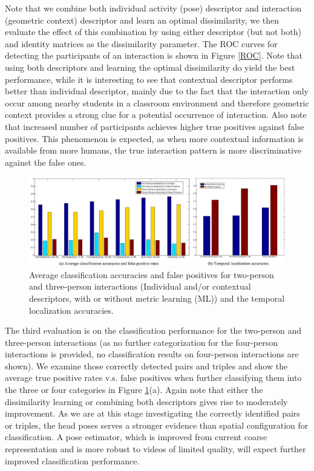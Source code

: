 \documentclass[10pt,twocolumn,letterpaper]{article}
\begin{document}
Note that we combine both individual activity (pose) descriptor and interaction (geometric context) descriptor and learn an optimal dissimilarity, we then evaluate the effect of this combination by using either descriptor (but not both) and identity matrices as the dissimilarity parameter. The ROC curves for detecting the participants of an interaction is shown in Figure \ref{ROC}. Note that using both descriptors and learning the optimal dissimilarity do yield the best performance, while it is interesting to see that contextual descriptor performs better than individual descriptor, mainly due to the fact that the interaction only occur among nearby students in a classroom environment and therefore geometric context provides a strong clue for a potential occurrence of interaction. Also note that increased number of participants achieves higher true positives against false positives. This phenomenon is expected, as when more contextual information is available from more humans, the true interaction pattern is more discriminative against the false ones.

\begin{figure}[t]
\begin{center}
\includegraphics[scale=2.5]{classtemporal.png}
\end{center}
\caption{ Average classification accuracies and false positives for two-person and three-person interactions (Individual and/or contextual descriptors, with or without metric learning (ML)) and the temporal localization accuracies.}
\label{classtemporal}
\end{figure}

The third evaluation is on the classification performance for the two-person and three-person interactions (as no further categorization for the four-person interactions is provided, no classification results on four-person interactions are shown). We examine those correctly detected pairs and triples and show the average true positive rates v.s. false positives when further classifying them into the three or four categories in Figure \ref{classtemporal}(a). Again note that either the dissimilarity learning or combining both descriptors gives rise to moderately improvement. As we are  at this stage investigating the correctly identified pairs or triples, the head poses serves a stronger evidence than spatial configuration for classification. A pose estimator, which is improved from current coarse representation and is more robust to videos of limited quality, will expect further improved classification performance.
\end{document}
